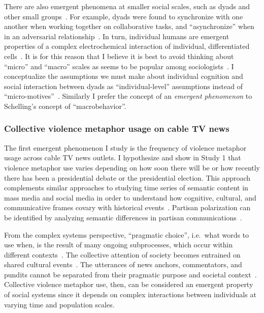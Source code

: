 There are also emergent phenomena
at smaller social scales, such as dyads and other small groups~\cite{Abney2014a}. 
For example, dyads were found to synchronize with one another when working
together on collaborative tasks, and ``asynchronize'' when in an adversarial 
relationship~\cite{Abney2014,Ramirez-Aristizabal2018,Schloesser2019,Schneider2020,Abney2021}.
In turn, individual humans are emergent properties of a complex electrochemical
interaction of individual, differentiated cells~\cite{Schrodinger2012,Kello2007,Lazer2009}.
It is for this reason that I believe it is best to avoid thinking about
``micro'' and ``macro'' scales as seems to be popular among 
sociologists~\cite{Macy2002}. I conceptualize the assumptions
we must make about individual cognition and social interaction between dyads
as ``individual-level'' assumptions instead of ``micro-motives''~\cite{Schelling2006}.
Similarly I prefer the concept of an 
\emph{emergent phenomenon} to Schelling's concept of ``macrobehavior''.


\subsubsection{Collective violence metaphor usage on cable TV news}

The first emergent phenomenon I study is the frequency of violence metaphor
usage across cable TV news outlets. I hypothesize and show in Study 1 that
violence metaphor use varies depending on how soon there will
be or how recently there has been a presidential debate or the presidential 
election. This approach
complements similar approaches to studying time series of semantic content in
mass media and social media in order to understand how cognitive, cultural, and
communicative frames covary with historical 
events~\cite{Nunn2012,Klingenstein2014,Hamilton2016c,Caliskan2017,Barron2018,Garg2018}. 
Partisan polarization can be identified by analyzing semantic differences in partisan
communications~\cite{Gentzkow2019}.

From the complex systems perspective, ``pragmatic choice'', i.e.\ what words
to use when, is the result of many ongoing subprocesses, which occur within
different contexts~\cite{Gibbs2012a}. The collective attention of society becomes entrained on
shared cultural events~\cite{Fusaroli2015}. The utterances of news anchors, commentators, and 
pundits cannot be separated from their pragmatic purpose and societal context~\cite{Kovecses2010}.
Collective violence metaphor use, then, can be considered an emergent property of 
social systems since it depends on complex interactions between individuals
at varying time and population scales. 


